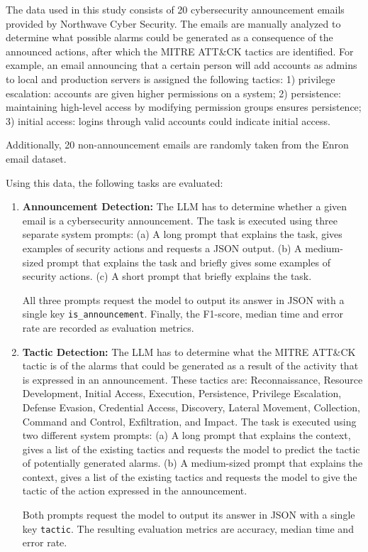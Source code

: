 The data used in this study consists of 20 cybersecurity announcement emails provided by Northwave Cyber Security.
The emails are manually analyzed to determine what possible alarms could be generated as a consequence of the announced
actions, after which the MITRE ATT\&CK tactics are identified.
For example, an email announcing that a certain person will add accounts as admins to local and production servers
is assigned the following tactics: 1) privilege escalation: accounts are given higher permissions on a system;
2) persistence: maintaining high-level access by modifying permission groups ensures persistence;
3) initial access: logins through valid accounts could indicate initial access.

Additionally, 20 non-announcement emails are randomly taken from the Enron email dataset.

Using this data, the following tasks are evaluated:
\begin{enumerate}
    \item \textbf{Announcement Detection:}
    The LLM has to determine whether a given email is a cybersecurity announcement.
    The task is executed using three separate system prompts:
    (a) A long prompt that explains the task, gives examples of security actions and requests a JSON output.
    (b) A medium-sized prompt that explains the task and briefly gives some examples of security actions.
    (c) A short prompt that briefly explains the task.

    All three prompts request the model to output its answer in JSON with a single key \texttt{is\_announcement}.
    Finally, the F1-score, median time and error rate are recorded as evaluation metrics.

    \item \textbf{Tactic Detection:}
    The LLM has to determine what the MITRE ATT\&CK tactic is of the alarms that could be generated as a result of the
    activity that is expressed in an announcement.
    These tactics are: Reconnaissance, Resource Development, Initial Access, Execution, Persistence, Privilege
    Escalation, Defense Evasion, Credential Access, Discovery, Lateral Movement, Collection, Command and Control,
    Exfiltration, and Impact.
    The task is executed using two different system prompts:
    (a) A long prompt that explains the context, gives a list of the existing tactics and requests the model to predict
    the tactic of potentially generated alarms.
    (b) A medium-sized prompt that explains the context, gives a list of the existing tactics and requests the model to
    give the tactic of the action expressed in the announcement.

    Both prompts request the model to output its answer in JSON with a single key \texttt{tactic}.
    The resulting evaluation metrics are accuracy, median time and error rate.
\end{enumerate}

